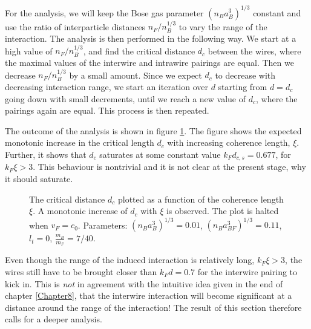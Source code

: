 For the analysis, we will keep the Bose gas parameter $(n_Ba_B^3)^{1/3}$ constant and use the ratio of interparticle distances $n_F/n_B^{1/3}$ to vary the range of the interaction. The analysis is then performed in the following way. We start at a high value of $n_F/n_B^{1/3}$, and find the critical distance $d_c$ between the wires, where the maximal values of the interwire and intrawire pairings are equal. Then we decrease $n_F/n_B^{1/3}$ by a small amount. Since we expect $d_c$ to decrease with decreasing interaction range, we start an iteration over $d$ starting from $d = d_c$ going down with small decrements, until we reach a new value of $d_c$, where the pairings again are equal. This process is then repeated.

The outcome of the analysis is shown in figure \ref{fig.twowirescrossoverxidepend}. The figure shows the expected monotonic increase in the critical length $d_c$ with increasing coherence length, $\xi$. Further, it shows that $d_c$ saturates at some constant value $k_Fd_{c,s} = 0.677$, for $k_F\xi > 3$. This behaviour is nontrivial and it is not clear at the present stage, why it should saturate. 

\begin{figure} 
\begin{center}  
  
\caption{The critical distance $d_c$ plotted as a function of the coherence length $\xi$. A monotonic increase of $d_c$ with $\xi$ is observed. The plot is halted when $v_F = c_0$. Parameters: $(n_Ba_B^3)^{1/3} = 0.01$, $(n_Ba_{BF}^3)^{1/3} = 0.11$, $l_t = 0$, $\frac{m_B}{m_F} = 7/40$. }  
\label{fig.twowirescrossoverxidepend}  
\end{center}    
\end{figure}

Even though the range of the induced interaction is relatively long, $k_F\xi > 3$, the wires still have to be brought closer than $k_Fd = 0.7$ for the interwire pairing to kick in. This is \textit{not} in agreement with the intuitive idea given in the end of chapter \ref{Chapter8}, that the interwire interaction will become significant at a distance around the range of the interaction! The result of this section therefore calls for a deeper analysis. 

 



